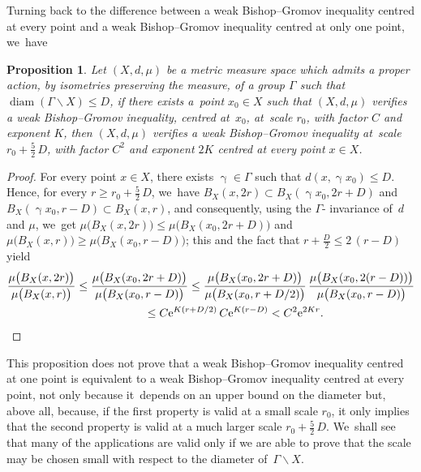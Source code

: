 \documentclass[pdftex]{sigma}
\numberwithin{equation}{section}
\newtheorem{prop}[theor]{Proposition}
\newcommand{\diam}{\operatorname{diam}}
\newcommand{\g}{\operatorname{\gamma}}
\begin{document}
Turning back to the difference between a weak Bishop--Gromov inequality centred at every point and a weak Bishop--Gromov inequality centred at only one point, we~have

\begin{prop}%
Let $(X, d, \mu)$ be a metric measure space which admits a proper action,
by isometries preserving the measure, of a group $\Gamma$ such that
$\diam (\Gamma \backslash X) \le D$, if there exists a~point $x_0 \in X$ such that $(X, d, \mu)$ verifies a weak Bishop--Gromov inequality, centred
at~$x_0$, at~scale $r_0$, with factor $C$ and exponent $K$, then $(X, d, \mu)$ verifies a weak Bishop--Gromov inequality at~scale $r_0 + \frac{5}{2}\,
D$, with factor $C^2$ and exponent $2 K$ centred at every point $x \in X$.
\end{prop}

\begin{proof} For every point $x \in X$, there exists $\g \in \Gamma$ such that $d(x, \g x_0) \le D$. Hence, for every $r \ge r_0 + \frac{5}{2}\, D$, we~have
$B_X(x,2 r) \subset B_X(\g x_0, 2 r + D)$ and $ B_X(\g x_0, r - D) \subset B_X(x, r)$, and consequently, using the $\Gamma$- invariance of~$d$ and $\mu$, we~get $\mu \big( B_X(x, 2 r)\big) \le \mu \big( B_X( x_0, 2 r + D)\big)$
and $\mu \big( B_X(x, r)\big) \ge \mu \big( B_X( x_0, r - D)\big)$; this
and the fact
that $ r + \frac{D}{2} \le 2\, (r -D)$ yield
\begin{gather*}
\dfrac{\mu \big( B_X(x, 2 r)\big)}{\mu \big( B_X(x,r)\big)} \le \dfrac{\mu \big( B_X( x_0, 2 r + D)\big)}{\mu \big( B_X( x_0, r- D)\big)} \leq
\dfrac{\mu \big( B_X( x_0, 2 r + D)\big)}{\mu \big( B_X( x_0, r+ D/2)\big)} \, \dfrac{\mu \big( B_X( x_0, 2 (r - D))\big)}{\mu \big( B_X( x_0,r- D)\big)}
\\ \hphantom{\dfrac{\mu \big( B_X(x, 2 r)\big)}{\mu \big( B_X(x,r)\big)}}
{}\le C {\rm e}^{K ( r+ D/2)}\, C {\rm e}^{K ( r-D)} < C^2 {\rm e}^{2 K r}.
\tag*{\qed}
\end{gather*}
\renewcommand{\qed}{}
\end{proof}



This proposition does not prove that a weak Bishop--Gromov inequality centred at one point is equivalent to a weak Bishop--Gromov inequality centred
at
every point, not only because it~depends on an upper bound on the diameter but, above all, because, if the first property is valid at a small scale $r_0$, it
only implies that the second property is valid at a much larger scale $r_0 + \frac{5}{2}\, D$. We~shall see that many
of the applications are valid only if we are able to prove that the scale
may be chosen small with respect to the diameter of~$\Gamma \backslash X$.
\end{document}
